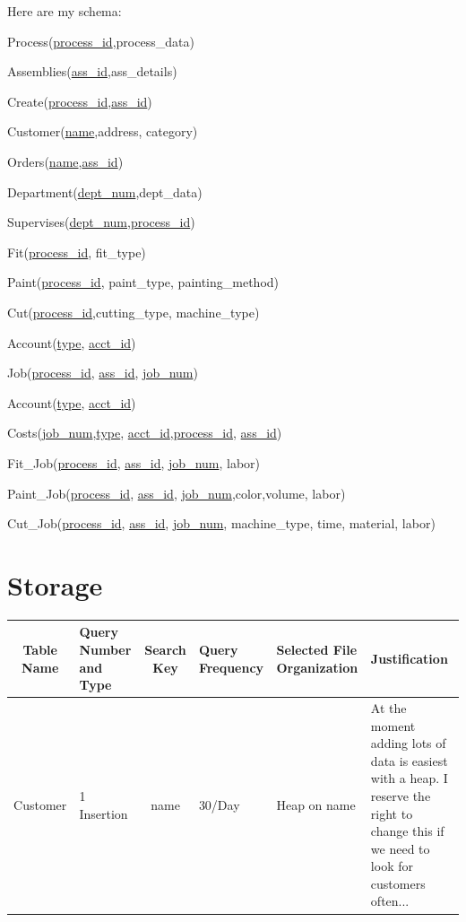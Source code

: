 \documentclass[11pt]{article}
\begin{document}
\indent Here are my schema:

Process(\underline{process\_id},process\_data)

Assemblies(\underline{ass\_id},ass\_details)

Create(\underline{process\_id},\underline{ass\_id})

Customer(\underline{name},address, category)

Orders(\underline{name},\underline{ass\_id})

Department(\underline{dept\_num},dept\_data)

Supervises(\underline{dept\_num},\underline{process\_id})

Fit(\underline{process\_id}, fit\_type)

Paint(\underline{process\_id}, paint\_type, painting\_method)

Cut(\underline{process\_id},cutting\_type, machine\_type)

Account(\underline{type}, \underline{acct\_id})

Job(\underline{process\_id}, \underline{ass\_id}, \underline{job\_num})

Account(\underline{type}, \underline{acct\_id})

Costs(\underline{job\_num},\underline{type}, \underline{acct\_id},\underline{process\_id}, \underline{ass\_id})

Fit\_Job(\underline{process\_id}, \underline{ass\_id}, \underline{job\_num}, labor)

Paint\_Job(\underline{process\_id}, \underline{ass\_id}, \underline{job\_num},color,volume, labor)

Cut\_Job(\underline{process\_id}, \underline{ass\_id}, \underline{job\_num}, machine\_type, time, material, labor)

\newpage
\section{Storage}

\begin{tabular}{|c|p{.75in}|c|p{.75in}|p{.75in}|p{.75in}|}\hline
Table Name & Query Number and Type & Search Key& Query Frequency& Selected File Organization & Justification\\ \hline\hline
Customer & 1 Insertion & name & 30/Day & Heap on name & At the moment adding lots of data is easiest with a heap.  I reserve the right to change this if we need to look for customers often...\\ \hline 



\end{tabular}
\end{document}
